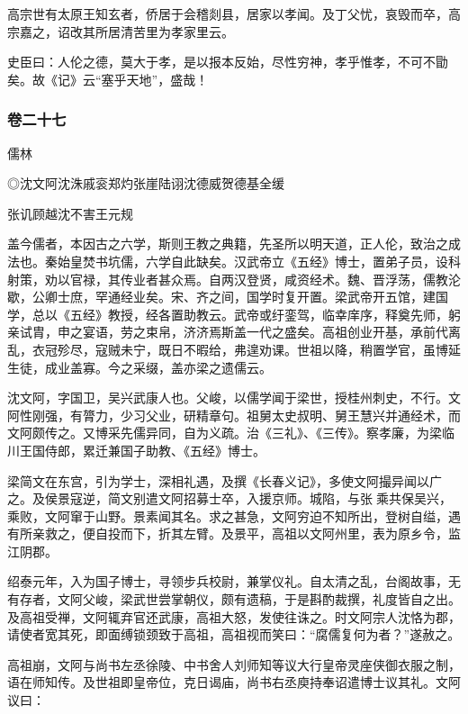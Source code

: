 \documentclass[]{article}
\begin{document}
高宗世有太原王知玄者，侨居于会稽剡县，居家以孝闻。及丁父忧，哀毁而卒，高宗嘉之，诏改其所居清苦里为孝家里云。

史臣曰：人伦之德，莫大于孝，是以报本反始，尽性穷神，孝乎惟孝，不可不勖矣。故《记》云``塞乎天地''，盛哉！

\hypertarget{header-n5036}{%
\subsubsection{卷二十七}\label{header-n5036}}

儒林

◎沈文阿沈洙戚衮郑灼张崖陆诩沈德威贺德基全缓

张讥顾越沈不害王元规

盖今儒者，本因古之六学，斯则王教之典籍，先圣所以明天道，正人伦，致治之成法也。秦始皇焚书坑儒，六学自此缺矣。汉武帝立《五经》博士，置弟子员，设科射策，劝以官禄，其传业者甚众焉。自两汉登贤，咸资经术。魏、晋浮荡，儒教沦歇，公卿士庶，罕通经业矣。宋、齐之间，国学时复开置。梁武帝开五馆，建国学，总以《五经》教授，经各置助教云。武帝或纡銮驾，临幸庠序，释奠先师，躬亲试胄，申之宴语，劳之束帛，济济焉斯盖一代之盛矣。高祖创业开基，承前代离乱，衣冠殄尽，寇贼未宁，既日不暇给，弗遑劝课。世祖以降，稍置学官，虽博延生徒，成业盖寡。今之采缀，盖亦梁之遗儒云。

沈文阿，字国卫，吴兴武康人也。父峻，以儒学闻于梁世，授桂州刺史，不行。文阿性刚强，有膂力，少习父业，研精章句。祖舅太史叔明、舅王慧兴并通经术，而文阿颇传之。又博采先儒异同，自为义疏。治《三礼》、《三传》。察孝廉，为梁临川王国侍郎，累迁兼国子助教、《五经》博士。

梁简文在东宫，引为学士，深相礼遇，及撰《长春义记》，多使文阿撮异闻以广之。及侯景寇逆，简文别遣文阿招募士卒，入援京师。城陷，与张乘共保吴兴，乘败，文阿窜于山野。景素闻其名。求之甚急，文阿穷迫不知所出，登树自缢，遇有所亲救之，便自投而下，折其左臂。及景平，高祖以文阿州里，表为原乡令，监江阴郡。

绍泰元年，入为国子博士，寻领步兵校尉，兼掌仪礼。自太清之乱，台阁故事，无有存者，文阿父峻，梁武世尝掌朝仪，颇有遗稿，于是斟酌裁撰，礼度皆自之出。及高祖受禅，文阿辄弃官还武康，高祖大怒，发使往诛之。时文阿宗人沈恪为郡，请使者宽其死，即面缚锁颈致于高祖，高祖视而笑曰：``腐儒复何为者？''遂赦之。

高祖崩，文阿与尚书左丞徐陵、中书舍人刘师知等议大行皇帝灵座侠御衣服之制，语在师知传。及世祖即皇帝位，克日谒庙，尚书右丞庾持奉诏遣博士议其礼。文阿议曰：
\end{document}
